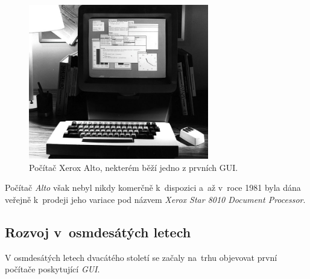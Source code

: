 \documentclass[11pt,twoside,a4paper]{book}
\begin{document}
\begin{figure}[!ht]
\begin{center}
  \includegraphics[width=0.7\textwidth]{altost2}
\caption{{\label{fig:altoGUI}}Počítač Xerox Alto, nekterém běží jedno z prvních GUI.\cite{bib:altoImage}}
\end{center}
\end{figure}
Počítač \textit{Alto} však nebyl nikdy komerčně k~dispozici a~až v~roce 1981 byla dána veřejně k~prodeji jeho variace pod názvem \textit{Xerox Star 8010 Document Processor}.

\subsection{Rozvoj v~osmdesátých letech}
V osmdesátých letech dvacátého století se začaly na~trhu objevovat první počítače poskytující \textit{GUI}.\cite{bib:history}
\end{document}
